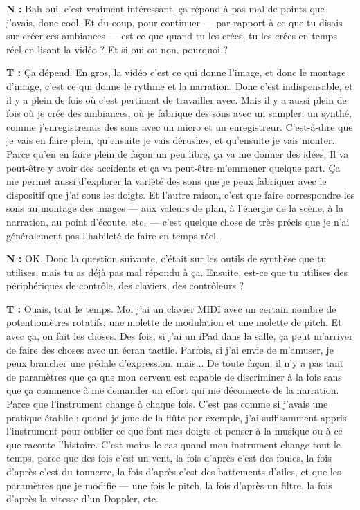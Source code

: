 ﻿\documentclass[12pt]{article}
\begin{document}
\textbf{N :} Bah oui, c'est vraiment intéressant, ça répond à pas mal de points que j'avais, donc cool. Et du coup, pour continuer — par rapport à ce que tu disais sur créer ces ambiances — est-ce que quand tu les crées, tu les crées en temps réel en lisant la vidéo ? Et si oui ou non, pourquoi ? 

\textbf{T :} Ça dépend. En gros, la vidéo c'est ce qui donne l'image, et donc le montage d'image, c'est ce qui donne le rythme et la narration. Donc c'est indispensable, et il y a plein de fois où c'est pertinent de travailler avec. Mais il y a aussi plein de fois où je crée des ambiances, où je fabrique des sons avec un sampler, un synthé, comme j'enregistrerais des sons avec un micro et un enregistreur. C'est-à-dire que je vais en faire plein, qu'ensuite je vais dérushes, et qu'ensuite je vais monter. Parce qu'en en faire plein de façon un peu libre, ça va me donner des idées. Il va peut-être y avoir des accidents et ça va peut-être m'emmener quelque part. Ça me permet aussi d'explorer la variété des sons que je peux fabriquer avec le dispositif que j'ai sous les doigts. Et l'autre raison, c'est que faire correspondre les sons au montage des images — aux valeurs de plan, à l'énergie de la scène, à la narration, au point d'écoute, etc. — c'est quelque chose de très précis que je n'ai généralement pas l'habileté de faire en temps réel. 

\textbf{N :} OK. Donc la question suivante, c'était sur les outils de synthèse que tu utilises, mais tu as déjà pas mal répondu à ça. Ensuite, est-ce que tu utilises des périphériques de contrôle, des claviers, des contrôleurs ? 

\textbf{T :} Ouais, tout le temps. Moi j'ai un clavier MIDI avec un certain nombre de potentiomètres rotatifs, une molette de modulation et une molette de pitch. Et avec ça, on fait les choses. Des fois, si j'ai un iPad dans la salle, ça peut m'arriver de faire des choses avec un écran tactile. Parfois, si j'ai envie de m'amuser, je peux brancher une pédale d'expression, mais... De toute façon, il n'y a pas tant de paramètres que ça que mon cerveau est capable de discriminer à la fois sans que ça commence à me demander un effort qui me déconnecte de la narration. Parce que l'instrument change à chaque fois. C'est pas comme si j'avais une pratique établie : quand je joue de la flûte par exemple, j'ai suffisamment appris l'instrument pour oublier ce que font mes doigts et penser à la musique ou à ce que raconte l'histoire. C'est moins le cas quand mon instrument change tout le temps, parce que des fois c'est un vent, la fois d'après c'est des foules, la fois d'après c'est du tonnerre, la fois d'après c'est des battements d'ailes, et que les paramètres que je modifie — une fois le pitch, la fois d'après un filtre, la fois d'après la vitesse d'un Doppler, etc. 
\end{document}
